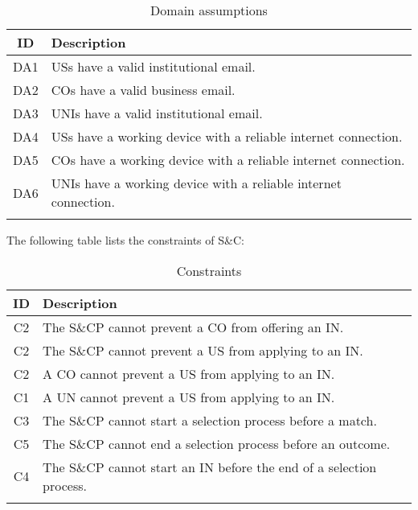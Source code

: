 \renewcommand{\arraystretch}{1.5}
\begin{longtable}{|c|p{12.5cm}|}
    \hline \rowcolor{polimiblue!40}
    \textbf{ID} & \textbf{Description} \\ \hline \hline
    DA1 & USs have a valid institutional email. \\ \hline
    DA2 & COs have a valid business email. \\ \hline
    DA3 & UNIs have a valid institutional email. \\ \hline
    DA4 & USs have a working device with a reliable internet connection. \\ \hline
    DA5 & COs have a working device with a reliable internet connection. \\ \hline
    DA6 & UNIs have a working device with a reliable internet connection. \\ \hline
\caption{Domain assumptions}
\end{longtable}

The following table lists the constraints of S\&C: 

\renewcommand{\arraystretch}{1.5}
\begin{longtable}{|c|p{12.5cm}|}
    \hline \rowcolor{polimiblue!40}
    \textbf{ID} & \textbf{Description} \\ \hline \hline
    C2 & The S\&CP cannot prevent a CO from offering an IN. \\ \hline
    C2 & The S\&CP cannot prevent a US from applying to an IN. \\ \hline
    C2 & A CO cannot prevent a US from applying to an IN. \\ \hline
    C1 & A UN cannot prevent a US from applying to an IN. \\ \hline
    C3 & The S\&CP cannot start a selection process before a match. \\ \hline
    C5 & The S\&CP cannot end a selection process before an outcome. \\ \hline
    C4 & The S\&CP cannot start an IN before the end of a selection process. \\ \hline
\caption{Constraints}
\end{longtable}
